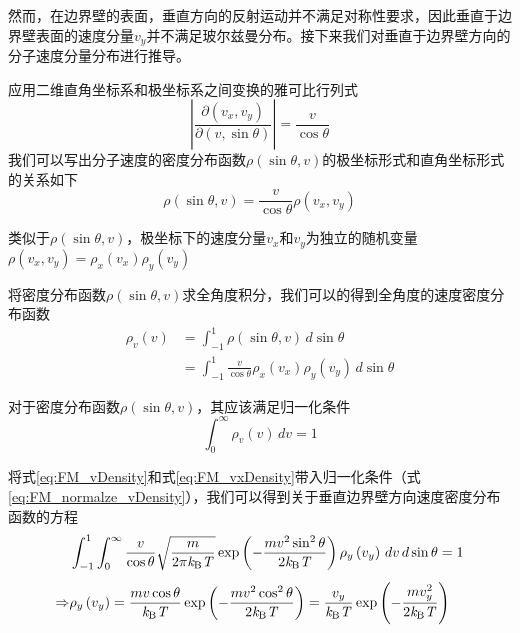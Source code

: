     然而，在边界壁的表面，垂直方向的反射运动并不满足对称性要求，因此垂直于边界壁表面的速度分量$v_y$并不满足玻尔兹曼分布。接下来我们对垂直于边界壁方向的分子速度分量分布进行推导。
    
    应用二维直角坐标系和极坐标系之间变换的雅可比行列式\chinesecolon
    \begin{equation}
        \left\lvert \frac{\partial \left(v_x,v_y\right)}{\partial \left(v,\sin\theta\right)}\right\rvert=\frac{v}{\cos\theta}
    \end{equation}
    我们可以写出分子速度的密度分布函数$\rho\left(\sin\theta,v\right)$的极坐标形式和直角坐标形式的关系如下\chinesecolon
    \[
        \rho\left(\sin\theta, v\right)=\frac{v}{\cos\theta}\rho\left(v_x,v_y\right)
    \]

    类似于$\rho\left(\sin\theta,v\right)$，极坐标下的速度分量$v_x$和$v_y$为独立的随机变量$\rho\left(v_x,v_y\right)=\rho_x\left(v_x\right)\rho_y\left(v_y\right)$

    将密度分布函数$\rho\left(\sin\theta,v\right)$求全角度积分，我们可以的得到全角度的速度密度分布函数
    \begin{equation}
        \label{eq:FM_vDensity}
        \begin{split}
            \rho_v\left(v\right)&=\int_{-1}^{1} \rho\left(\sin\theta,v\right) \,d\sin\theta \\[+1ex]
            &= \int_{-1}^{1} \frac{v}{\cos\theta} \rho_x\left(v_x\right)\rho_y\left(v_y\right) \,d\sin\theta
        \end{split}
    \end{equation}

    对于密度分布函数$\rho\left(\sin\theta,v\right)$，其应该满足归一化条件\chinesecolon
    \begin{equation}
        \label{eq:FM_normalze_vDensity}
        \int_{0}^{\infty} \rho_v\left(v\right) \,dv = 1
    \end{equation}
    
    将式\ref{eq:FM_vDensity}和式\ref{eq:FM_vxDensity}带入归一化条件（式\ref{eq:FM_normalze_vDensity}），我们可以得到关于垂直边界壁方向速度密度分布函数的方程\chinesecolon
    \begin{equation}
        \label{eq:FM_vyDensity}
        \begin{split}
            & \int_{-1}^{1} \int_{0}^{\infty} \frac{v}{\cos\theta} \sqrt{\frac{m}{2\pi\it k_{\rm B} \it T}}\exp\left({-\frac{mv^2\sin^2\theta}{2\it k_{\rm B} \it T}}\right)\rho_y\left(v_y\right) \,dv  \,d\sin\theta =1\\[+1ex]
\Rightarrow & \rho_y\left(v_y\right)=\frac{mv\cos\theta}{\it k_{\rm B} \it T}\exp\left({-\frac{mv^2\cos^2\theta}{2\it k_{\rm B} \it T}}\right)=\frac{v_y}{\it k_{\rm B} \it T}\exp\left(-\frac{mv_y^2}{2\it k_{\rm B} \it T}\right)
        \end{split}
    \end{equation}

